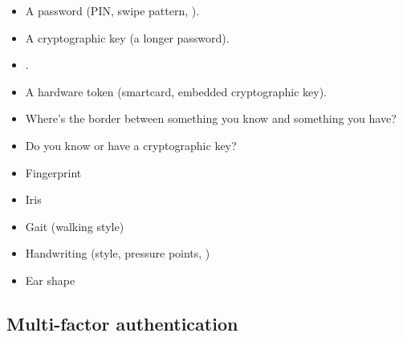 \begin{frame}
  \begin{example}
    \begin{itemize}
      \item A password (PIN, swipe pattern, \etc).
      \item A cryptographic key (a longer password).
    \end{itemize}
  \end{example}
\end{frame}

\begin{frame}
  \begin{example}
    \begin{itemize}
      \item {}.
      \item A hardware token (smartcard, embedded cryptographic key).
    \end{itemize}
  \end{example}

  \pause

  \begin{remark}
    \begin{itemize}
      \item Where's the border between something you know and something you 
        have?
      \item Do you know or have a cryptographic key?
    \end{itemize}
  \end{remark}
\end{frame}

\begin{frame}
  \begin{example}
    \begin{itemize}
      \item Fingerprint
      \item Iris
      \item Gait (walking style)
      \item Handwriting (style, pressure points, \etc)
      \item Ear shape
    \end{itemize}
  \end{example}
\end{frame}

\subsection{Multi-factor authentication}


